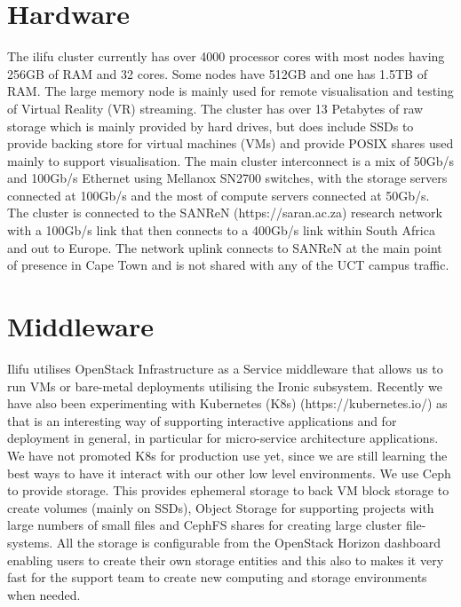 \documentclass{iau_FM}
\begin{document}


\section{Hardware}
\label{sec:hardware}



The ilifu cluster currently has over 4000 processor cores with most nodes having 256GB of RAM and 32 cores. 
Some nodes have 512GB 
and one has 1.5TB of RAM. The large memory node is mainly used for remote visualisation 
 and testing of Virtual
Reality (VR) streaming. The cluster has over 13 Petabytes of raw storage which is mainly provided
 by hard drives, but 
does include SSDs to provide backing store for virtual machines (VMs) and provide
POSIX shares used mainly
to support visualisation. The main
 cluster interconnect is a mix of 50Gb/s and 100Gb/s Ethernet using Mellanox SN2700 switches, 
 with the storage servers connected at 100Gb/s and the 
most of compute servers connected at 50Gb/s. The cluster is connected to 
the SANReN (https://saran.ac.za) research network with a 100Gb/s link
that then connects to a 400Gb/s link within South Africa and out to Europe. 
The network uplink connects 
to SANReN at the main point of presence in Cape Town and is not shared
with any of the UCT campus traffic.


\section{Middleware}
\label{sec:middleware}

Ilifu utilises OpenStack Infrastructure as a Service middleware that allows us to run VMs
 or bare-metal deployments
utilising the Ironic subsystem. Recently we have also been experimenting with 
Kubernetes (K8s) (https://kubernetes.io/)
as that is an interesting way of supporting interactive applications and for deployment
in general, in particular for micro-service architecture applications. We have not promoted K8s for
 production use yet, since we are still learning the best ways to have it interact with our
 other low level environments.
We use Ceph to provide storage. This provides ephemeral storage to back VM
block storage to create volumes (mainly on SSDs), Object Storage for supporting projects
with large numbers of small files and
CephFS shares for creating large cluster file-systems. All the storage is configurable from the 
OpenStack Horizon dashboard enabling users to create their own storage entities
and this also to makes it very fast for the support team to create new computing
and storage environments when needed.
\end{document}

